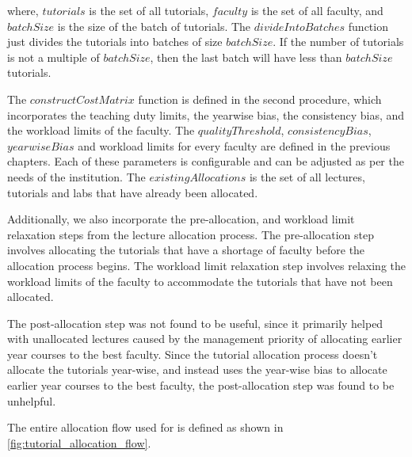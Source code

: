 where, $tutorials$ is the set of all tutorials, $faculty$ is the set of all faculty, and $batchSize$ is the size of the batch of tutorials. The $divideIntoBatches$ function just divides the tutorials into batches of size $batchSize$. If the number of tutorials is not a multiple of $batchSize$, then the last batch will have less than $batchSize$ tutorials.

The $constructCostMatrix$ function is defined in the second procedure, which incorporates the teaching duty limits, the yearwise bias, the consistency bias, and the workload limits of the faculty. The $qualityThreshold$, $consistencyBias$, $yearwiseBias$ and workload limits for every faculty are defined in the previous chapters. Each of these parameters is configurable and can be adjusted as per the needs of the institution. The $existingAllocations$ is the set of all lectures, tutorials and labs that have already been allocated.

Additionally, we also incorporate the pre-allocation, and workload limit relaxation steps from the lecture allocation process. The pre-allocation step involves allocating the tutorials that have a shortage of faculty before the allocation process begins. The workload limit relaxation step involves relaxing the workload limits of the faculty to accommodate the tutorials that have not been allocated.

The post-allocation step was not found to be useful, since it primarily helped with unallocated lectures caused by the management priority of allocating earlier year courses to the best faculty. Since the tutorial allocation process doesn't allocate the tutorials year-wise, and instead uses the year-wise bias to allocate earlier year courses to the best faculty, the post-allocation step was found to be unhelpful.

The entire allocation flow used for is defined as shown in \autoref{fig:tutorial_allocation_flow}.

